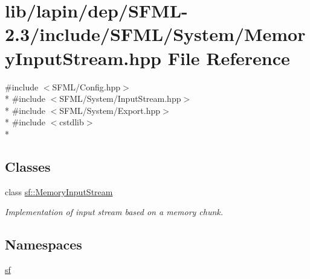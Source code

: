 \hypertarget{lapin_2dep_2_s_f_m_l-2_83_2include_2_s_f_m_l_2_system_2_memory_input_stream_8hpp}{\section{lib/lapin/dep/\-S\-F\-M\-L-\/2.3/include/\-S\-F\-M\-L/\-System/\-Memory\-Input\-Stream.hpp File Reference}
\label{lapin_2dep_2_s_f_m_l-2_83_2include_2_s_f_m_l_2_system_2_memory_input_stream_8hpp}
}
{\ttfamily \#include $<$S\-F\-M\-L/\-Config.\-hpp$>$}\\*
{\ttfamily \#include $<$S\-F\-M\-L/\-System/\-Input\-Stream.\-hpp$>$}\\*
{\ttfamily \#include $<$S\-F\-M\-L/\-System/\-Export.\-hpp$>$}\\*
{\ttfamily \#include $<$cstdlib$>$}\\*
\subsection*{Classes}
\begin{DoxyCompactItemize}
\item 
class \hyperlink{classsf_1_1_memory_input_stream}{sf\-::\-Memory\-Input\-Stream}
\begin{DoxyCompactList}\small\item\em Implementation of input stream based on a memory chunk. \end{DoxyCompactList}\end{DoxyCompactItemize}
\subsection*{Namespaces}
\begin{DoxyCompactItemize}
\item 
\hyperlink{namespacesf}{sf}
\end{DoxyCompactItemize}
